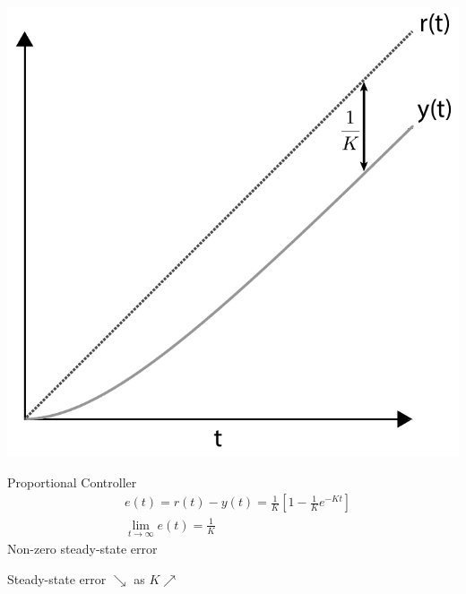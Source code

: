 \documentclass[twoside]{article}
\begin{document}
\vspace{12pt}

         \begin{minipage}[h]{0.5\linewidth}
    \begin{center}
      \includegraphics[width=1\textwidth]{ramp}
    \end{center}
  \end{minipage}
    \begin{minipage}[h]{0.5\linewidth}
        \begin{center}
          Proportional Controller
      \begin{align*}
	&e(t) = r(t) - y(t) = \frac{1}{K} \left[ 1 -  \frac{1}{K} e^{-K t} \right]
	\\
	&\lim_{t \to \infty} e(t) = \frac{1}{K}
      \end{align*}
      Non-zero steady-state error 
      
      Steady-state error $ \searrow$ as $K \nearrow$
          \end{center}
  \end{minipage}
      
    
\end{document}
